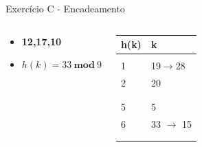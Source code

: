 \documentclass{beamer}
\begin{document}
\begin{frame}{Exercício C - Encadeamento}
\begin{columns}
        \footnotesize         
        \begin{block}{}
 		 \begin{itemize}
 		  \item \textbf{12,17,10}
 		  \item $h(k) = 33 \ \mathbf{mod} \ 9$  
 		 \end{itemize}

 		  \end{block} 
    
        \begin{table}[]
        \centering
        \footnotesize
        \begin{tabular}{|l|l|}
        \hline
        h(k) & k \\ \hline
            &   \\ \hline
        1   & 19$\rightarrow$28  \\ \hline
        2   & 20  \\ \hline
            &    \\ \hline
            &   \\ \hline
        5   & 5   \\ \hline
        6   & 33 $\rightarrow$ 15   \\ \hline
            &   \\ \hline
            &   \\ \hline
        \end{tabular}%

        \end{table}       
        \end{columns}
\end{frame}
\end{document}
